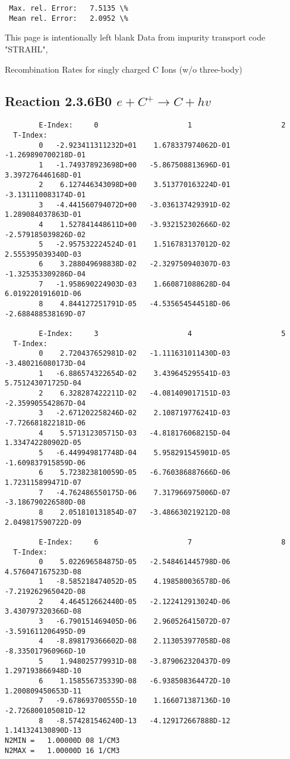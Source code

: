 \documentclass[12pt,dvipdfmx]{article}
\begin{document}
{\begin{small}
\begin{verbatim}
 Max. rel. Error:   7.5135 \%
 Mean rel. Error:   2.0952 \%

\end{verbatim}\end{small}
\newpage
This page is intentionally left blank
\newpage
Data from impurity transport code "STRAHL", \cite{kn:Behringer}

  Recombination Rates for singly charged C Ions (w/o three-body)
\subsection{
Reaction 2.3.6B0  $e + C^{+} \rightarrow C + hv$
}

\begin{small}\begin{verbatim}
        E-Index:     0                     1                     2
  T-Index:
        0   -2.923411311232D+01    1.678337974062D-01   -1.269890700218D-01
        1   -1.749378923698D+00   -5.867508813696D-01    3.397276446168D-01
        2    6.127446343098D+00    3.513770163224D-01   -3.131110083174D-01
        3   -4.441560794072D+00   -3.036137429391D-02    1.289084037863D-01
        4    1.527841448611D+00   -3.932152302666D-02   -2.579185039826D-02
        5   -2.957532224524D-01    1.516783137012D-02    2.555395039340D-03
        6    3.288049698838D-02   -2.329750940307D-03   -1.325353309286D-04
        7   -1.958690224903D-03    1.660871088628D-04    6.019220191601D-06
        8    4.844127251791D-05   -4.535654544518D-06   -2.688488538169D-07

        E-Index:     3                     4                     5
  T-Index:
        0    2.720437652981D-02   -1.111631011430D-03   -3.480216080173D-04
        1   -6.886574322654D-02    3.439645295541D-03    5.751243071725D-04
        2    6.328287422211D-02   -4.081409017151D-03   -2.359905542867D-04
        3   -2.671202258246D-02    2.108719776241D-03   -7.726681822181D-06
        4    5.571312305715D-03   -4.818176068215D-04    1.334742280902D-05
        5   -6.449949817748D-04    5.958291545901D-05   -1.609837915859D-06
        6    5.723823810059D-05   -6.760386887666D-06    1.723115899471D-07
        7   -4.762486550175D-06    7.317966975006D-07   -3.186790226580D-08
        8    2.051810131854D-07   -3.486630219212D-08    2.049817590722D-09

        E-Index:     6                     7                     8
  T-Index:
        0    5.022696584875D-05   -2.548461445798D-06    4.576047167523D-08
        1   -8.585218474052D-05    4.198580036578D-06   -7.219262965042D-08
        2    4.464512662440D-05   -2.122412913024D-06    3.430797320366D-08
        3   -6.790151469405D-06    2.960526415072D-07   -3.591611206495D-09
        4   -8.898179366602D-08    2.113053977058D-08   -8.335017960966D-10
        5    1.948025779931D-08   -3.879062320437D-09    1.297193866948D-10
        6    1.158556735339D-08   -6.938508364472D-10    1.200809450653D-11
        7   -9.678693700555D-10    1.166071387136D-10   -2.726800105081D-12
        8   -8.574281546240D-13   -4.129172667888D-12    1.141324130890D-13
N2MIN =   1.00000D 08 1/CM3
N2MAX =   1.00000D 16 1/CM3


\end{verbatim}
\end{small}}
\end{document}
